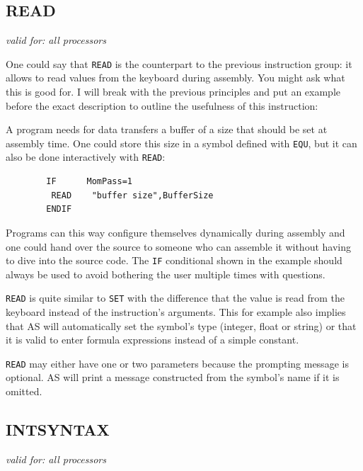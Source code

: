 \documentclass[12pt,twoside]{report}
\makeatletter
\newcommand{\tty}[1]{{\tt #1}}
\newcommand{\ttindex}[1]{\index{#1@{\tt #1}}}
\newcommand{\asname}{{AS}}
\makeatother
\begin{document}
\subsection{READ}
\ttindex{READ}

{\em valid for: all processors}

One could say that \tty{READ} is the counterpart to the previous
instruction group: it allows to read values from the keyboard during
assembly.  You might ask what this is good for.  I will break with
the previous principles and put an example before the exact
description to outline the usefulness of this instruction:

A program needs for data transfers a buffer of a size that should be
set at assembly time.  One could store this size in a symbol defined
with \tty{EQU}, but it can also be done interactively with \tty{READ}:
\begin{verbatim}
        IF      MomPass=1
         READ    "buffer size",BufferSize
        ENDIF
\end{verbatim}
Programs can this way configure themselves dynamically during assembly
and one could hand over the source to someone who can assemble it
without having to dive into the source code.  The \tty{IF} conditional
shown in the example should always be used to avoid bothering the
user multiple times with questions.

\tty{READ} is quite similar to \tty{SET} with the difference that the
value is read from the keyboard instead of the instruction's arguments.
This for example also implies that \asname{} will automatically set the symbol's
type (integer, float or string) or that it is valid to enter formula
expressions instead of a simple constant.

\tty{READ} may either have one or two parameters because the prompting
message is optional.  \asname{} will print a message constructed from the
symbol's name if it is omitted.


\subsection{INTSYNTAX}
\label{SectINTSYNTAX}
\ttindex{INTSYNTAX}

{\em valid for: all processors}
\end{document}
